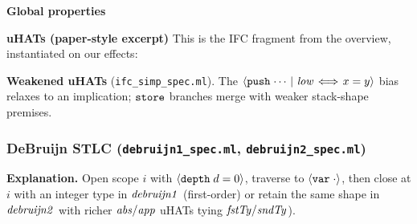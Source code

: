 \textbf{Global properties}
\vspace{-.35cm}\par{}
\vspace{-.4cm}\par\nobreak\noindent
\textbf{uHATs (paper-style excerpt)}
This is the IFC fragment from the overview, instantiated on our effects:
\vspace{-.35cm}\par{}
\vspace{-.4cm}\par\nobreak\noindent
\textbf{Weakened uHATs} (\texttt{ifc\_simp\_spec.ml}).
The \({\langle} {\boldsymbol{{\tt push}}\;{\cdots} ~|~ {\mathit{low}\!\iff\!x=y}} {\rangle}\) bias relaxes to an implication; \(\boldsymbol{{\tt store}}\) branches merge with weaker stack-shape premises.

\subsubsection*{DeBruijn STLC (\texttt{debruijn1\_spec.ml}, \texttt{debruijn2\_spec.ml})}
\textbf{Explanation.}
Open scope \(i\) with \({\langle} {\boldsymbol{{\tt depth}}\;{d=0}} {\rangle}\), traverse to \({\langle} {\boldsymbol{{\tt var}}\;{\cdot}} {\rangle}\), then close at \(i\) with an integer type in \(\mathit{debruijn1}\) (first-order) or retain the same shape in \(\mathit{debruijn2}\) with richer \(\mathit{abs}/\mathit{app}\) uHATs tying \(\mathit{fstTy}/\mathit{sndTy}\)).

